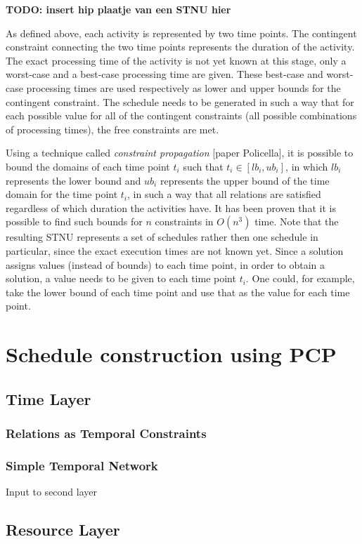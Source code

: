 \documentclass{article}
\newcommand{\TODO}[1]{{\color{red}\textbf{TODO: #1}}}
\begin{document}
\TODO{insert hip plaatje van een STNU hier}

As defined above, each activity is represented by two time points. The contingent constraint connecting the two time points represents the duration of the activity. The exact processing time of the activity is not yet known at this stage, only a worst-case and a best-case processing time are given. These best-case and worst-case processing times are used respectively as lower and upper bounds for the contingent constraint. The schedule needs to be generated in such a way that for each possible value for all of the contingent constraints (all possible combinations of processing times), the free constraints are met.

Using a technique called \emph{constraint propagation} [paper Policella], it is possible to bound the domains of each time point $t_i$ such that $t_i \in [lb_i, ub_i]$, in which $lb_i$ represents the lower bound and $ub_i$ represents the upper bound of the time domain for the time point $t_i$, in such a way that all relations are satisfied regardless of which duration the activities have. It has been proven that it is possible to find such bounds for $n$ constraints in $O(n^3)$ time. Note that the resulting STNU represents a set of schedules rather then one schedule in particular, since the exact execution times are not known yet. Since a solution assigns values (instead of bounds) to each time point, in order to obtain a solution, a value needs to be given to each time point $t_i$. One could, for example, take the lower bound of each time point and use that as the value for each time point.

\section{Schedule construction using PCP}
\subsection{Time Layer}
\subsubsection{Relations as Temporal Constraints}
\subsubsection{Simple Temporal Network}
Input to second layer

\subsection{Resource Layer}
\end{document}
